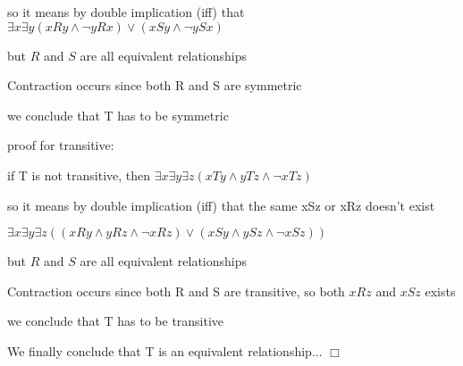 \documentclass[12pts,A4]{article}
\begin{document}
\begin{flushleft}
    so it means by double implication (iff) that $ \exists x \exists y  ( xRy \wedge \neg y R x) 
    \vee ( xSy\wedge \neg y S x) $

    

    but $R$ and $S$ are all equivalent relationships 

    Contraction occurs since both R and S are symmetric  


    we conclude that T has to be symmetric


    \bigskip

    proof for transitive:
    
    \bigskip

    if T is not transitive, then $ \exists x \exists y \exists z
    (xTy \wedge yTz \wedge \neg xTz)$

    so it means by double implication (iff) that the same xSz or xRz doesn't exist
    
    $ \exists x \exists y \exists z( (xRy \wedge yRz \wedge \neg xRz) \vee
(xSy \wedge ySz \wedge \neg xSz))$
    

    

    but $R$ and $S$ are all equivalent relationships 

    Contraction occurs since both R and S are transitive, 
    so both $xRz$ and $xSz$ exists 


    we conclude that T has to be transitive


    \bigskip


    We finally conclude that T is an equivalent relationship... $\Box$



\end{flushleft}
\end{document}
